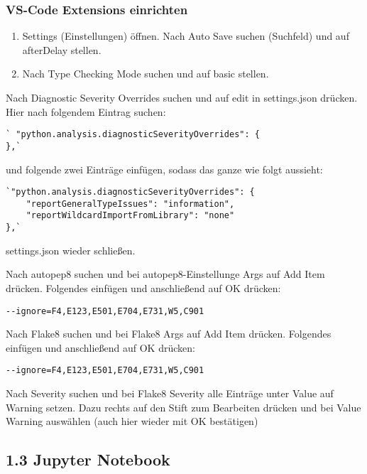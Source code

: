 \documentclass[
  11pt,
  a4paper,
  DIV=11,
  numbers=noendperiod]{scrartcl}
\begin{document}
\subsubsection{VS-Code Extensions
einrichten}\label{vs-code-extensions-einrichten}

\begin{enumerate}
\def\labelenumi{\arabic{enumi}.}
\item
  Settings (Einstellungen) öffnen. Nach Auto Save suchen (Suchfeld) und
  auf afterDelay stellen.
\item
  Nach Type Checking Mode suchen und auf basic stellen.
\end{enumerate}

Nach Diagnostic Severity Overrides suchen und auf edit in settings.json
drücken. Hier nach folgendem Eintrag suchen:

\begin{verbatim}
` "python.analysis.diagnosticSeverityOverrides": {
},`
\end{verbatim}

und folgende zwei Einträge einfügen, sodass das ganze wie folgt
aussieht:

\begin{verbatim}
`"python.analysis.diagnosticSeverityOverrides": {
    "reportGeneralTypeIssues": "information",
    "reportWildcardImportFromLibrary": "none"
},`
\end{verbatim}

settings.json wieder schließen.

Nach autopep8 suchen und bei autopep8-Einstellunge Args auf Add Item
drücken. Folgendes einfügen und anschließend auf OK drücken:

\texttt{-\/-ignore=F4,E123,E501,E704,E731,W5,C901}

Nach Flake8 suchen und bei Flake8 Args auf Add Item drücken. Folgendes
einfügen und anschließend auf OK drücken:

\texttt{-\/-ignore=F4,E123,E501,E704,E731,W5,C901}

Nach Severity suchen und bei Flake8 Severity alle Einträge unter Value
auf Warning setzen. Dazu rechts auf den Stift zum Bearbeiten drücken und
bei Value Warning auswählen (auch hier wieder mit OK bestätigen)

\subsection{1.3 Jupyter Notebook}\label{jupyter-notebook}
\end{document}
